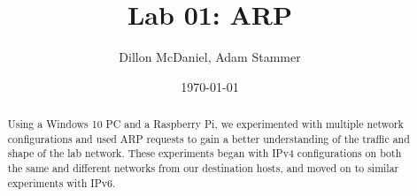 \documentclass[prb,preprint]{revtex4-1}
\begin{document}
\title{Lab 01: ARP}
\author{Dillon McDaniel, Adam Stammer}

\date{\today}

\begin{abstract}
Using a Windows 10 PC and a Raspberry Pi, we experimented with multiple network configurations and used ARP requests to gain a better understanding of the traffic and shape of the lab network. These experiments began with IPv4 configurations on both the same and different networks from our destination hosts, and moved on to similar experiments with IPv6.
\end{abstract}

\maketitle


%
%
%
%
%
%
%
%
\end{document}
